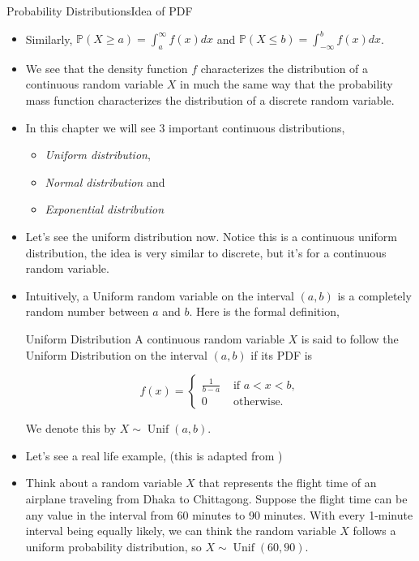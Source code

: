 \documentclass[8pt, usepdftitle=false]{beamer}
\begin{document}
\begin{frame}[allowframebreaks]{Probability Distributions}{Idea of PDF}
\begin{itemize}
\item Similarly, $\mathbb{P}(X \geq a)=\int_a^{\infty} f(x) d x$ and $\mathbb{P}(X \leq b)=\int_{-\infty}^b f(x) d x$. 


\item We see that the density function $f$ characterizes the distribution of a continuous random variable $X$ in much the same way that the probability mass function characterizes the distribution of a discrete random variable.


\item In this chapter we will see 3 important continuous distributions, 

\begin{itemize}
	\item \emph{Uniform distribution}, 
	\item \emph{Normal distribution} and 
	\item \emph{Exponential distribution} 
\end{itemize}


\item Let's see the uniform distribution now. Notice this is a continuous uniform distribution, the idea is very similar to discrete, but it's for a continuous random variable.

\item Intuitively, a Uniform random variable on the interval $(a, b)$ is a completely random number between $a$ and $b$. Here is the formal definition,

\begin{varblock}{Uniform Distribution}
A continuous random variable $X$ is said to follow the \alert{Uniform Distribution} on the interval $(a, b)$ if its PDF is

$$
f(x)= \begin{cases}\frac{1}{b-a} & \text { if } a<x<b, \\ 0 & \text { otherwise. }\end{cases}
$$

We denote this by $X \sim \operatorname{Unif}(a, b)$.
	
\end{varblock}


\item Let's see a real life example, (this is adapted from \citet{anderson_statistics_2020})

\framebreak

\item Think about a random variable $X$ that represents the flight time of an airplane traveling from Dhaka to Chittagong. Suppose the flight time can be any value in the interval from 60 minutes to 90 minutes. With every 1-minute interval being equally likely, we can think the random variable $X$ follows a uniform probability distribution, so $X \sim \operatorname{Unif}(60, 90)$.


\end{itemize}
\end{frame}
\end{document}
